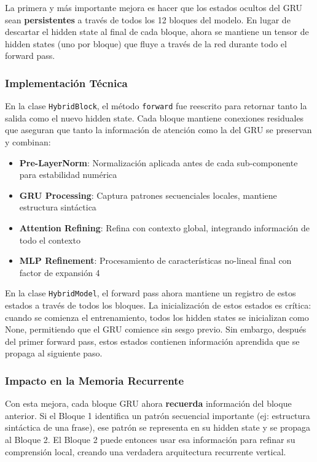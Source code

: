 La primera y más importante mejora es hacer que los estados ocultos del GRU sean \textbf{persistentes} a través de todos los 12 bloques del modelo. En lugar de descartar el hidden state al final de cada bloque, ahora se mantiene un tensor de hidden states (uno por bloque) que fluye a través de la red durante todo el forward pass.

\subsubsection{Implementación Técnica}

En la clase \texttt{HybridBlock}, el método \texttt{forward} fue reescrito para retornar tanto la salida como el nuevo hidden state. Cada bloque mantiene conexiones residuales que aseguran que tanto la información de atención como la del GRU se preservan y combinan:

\begin{itemize}
    \item \textbf{Pre-LayerNorm}: Normalización aplicada antes de cada sub-componente para estabilidad numérica
    \item \textbf{GRU Processing}: Captura patrones secuenciales locales, mantiene estructura sintáctica
    \item \textbf{Attention Refining}: Refina con contexto global, integrando información de todo el contexto
    \item \textbf{MLP Refinement}: Procesamiento de características no-lineal final con factor de expansión 4
\end{itemize}

En la clase \texttt{HybridModel}, el forward pass ahora mantiene un registro de estos estados a través de todos los bloques. La inicialización de estos estados es crítica: cuando se comienza el entrenamiento, todos los hidden states se inicializan como None, permitiendo que el GRU comience sin sesgo previo. Sin embargo, después del primer forward pass, estos estados contienen información aprendida que se propaga al siguiente paso.

\subsubsection{Impacto en la Memoria Recurrente}

Con esta mejora, cada bloque GRU ahora \textbf{recuerda} información del bloque anterior. Si el Bloque 1 identifica un patrón secuencial importante (ej: estructura sintáctica de una frase), ese patrón se representa en su hidden state y se propaga al Bloque 2. El Bloque 2 puede entonces usar esa información para refinar su comprensión local, creando una verdadera arquitectura recurrente vertical.

